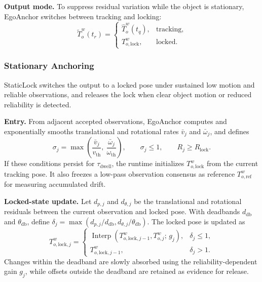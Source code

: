 \documentclass[review]{vgtc}
\begin{document}
\textbf{Output mode.} To suppress residual variation while the object is stationary, EgoAnchor switches between tracking and locking:
\begin{equation}
\widetilde{T}_o^w(t_r) = \begin{cases}
\widehat{T}_o^w(t_q), & \text{tracking}, \\
T_{o,\mathrm{lock}}^w, & \text{locked}.
\end{cases}
\label{eq:staticlock}
\end{equation}

\subsubsection{Stationary Anchoring}\label{sec:staticlock}

StaticLock switches the output to a locked pose under sustained low motion and reliable observations, and releases the lock when clear object motion or reduced reliability is detected.

\textbf{Entry.} From adjacent accepted observations, EgoAnchor computes and exponentially smooths translational and rotational rates $\bar v_j$ and $\bar\omega_j$, and defines
\begin{equation}
\sigma_j = \max\left(\frac{\bar{v}_j}{v_{\mathrm{th}}},\ \frac{\bar{\omega}_j}{\omega_{\mathrm{th}}}\right), \qquad \sigma_j \leq 1, \qquad R_j \geq R_{\mathrm{lock}}.
\label{eq:lock-entry}
\end{equation}
If these conditions persist for $\tau_{\mathrm{dwell}}$, the runtime initializes $T_{o,\mathrm{lock}}^w$ from the current tracking pose. It also freezes a low-pass observation consensus as reference $T_{o,\mathrm{ref}}^w$ for measuring accumulated drift.

\textbf{Locked-state update.} Let $d_{p,j}$ and $d_{\theta,j}$ be the translational and rotational residuals between the current observation and locked pose. With deadbands $d_{\mathrm{db}}$ and $\theta_{\mathrm{db}}$, define $\delta_j=\max(d_{p,j}/d_{\mathrm{db}},d_{\theta,j}/\theta_{\mathrm{db}})$. The locked pose is updated as
\begin{equation}
T_{o,\mathrm{lock},j}^w =
\begin{cases}
\operatorname{Interp}\left(T_{o,\mathrm{lock},j-1}^w, T_{o,j}^{w};\, g_j\right), & \delta_j \leq 1, \\
T_{o,\mathrm{lock},j-1}^w, & \delta_j > 1.
\end{cases}
\label{eq:lock-update}
\end{equation}
Changes within the deadband are slowly absorbed using the reliability-dependent gain $g_j$, while offsets outside the deadband are retained as evidence for release.
\end{document}
